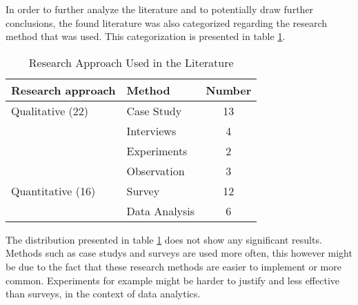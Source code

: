 In order to further analyze the literature and to potentially draw further conclusions, the found literature was also categorized regarding the research method that was used. This categorization is presented in table \ref{researchMethod}. 

\begin{table}[htbp]
    \centering
    \begin{tabular}{llc}
    \hline
    \multicolumn{1}{l}{Research approach} & \multicolumn{1}{l}{Method} & \multicolumn{1}{l}{Number} \\ \hline
    Qualitative (22)                      & Case Study                 & 13                         \\
                                          & Interviews                 & 4                          \\
                                          & Experiments                & 2                          \\
                                          & Observation                & 3                          \\
    Quantitative (16)                     & Survey                     & 12                         \\
                                          & Data Analysis              & 6                          \\ \hline
    \end{tabular}
    \caption{Research Approach Used in the Literature}
    \label{researchMethod}
    \end{table}

The distribution presented in table \ref{researchMethod} does not show any significant results. Methods such as case studys and surveys are used more often, this however might be due to the fact that these research methods are easier to implement or more common. Experiments for example might be harder to justify and less effective than surveys, in the context of data analytics. %


